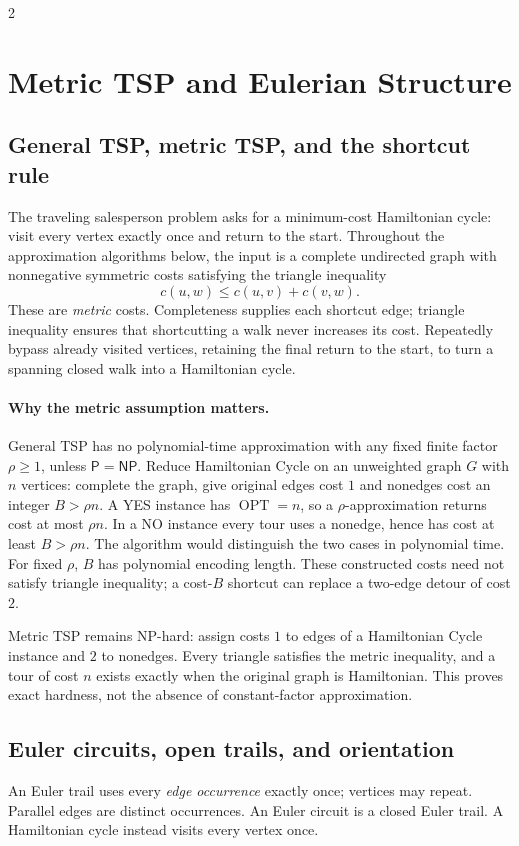 \documentclass[8pt]{extarticle}
\theoremstyle{definition}
\newcommand{\OPT}{\operatorname{OPT}}
\newcommand{\NP}{\mathsf{NP}}
\newcommand{\PTIME}{\mathsf{P}}
\begin{document}
\begin{multicols*}{2}
\section{Metric TSP and Eulerian Structure}\label{tsp:main}

\subsection{General TSP, metric TSP, and the shortcut rule}
The traveling salesperson problem asks for a minimum-cost Hamiltonian
cycle: visit every vertex exactly once and return to the start.  Throughout
the approximation algorithms below, the input is a complete undirected
graph with nonnegative symmetric costs satisfying the triangle inequality
\[
c(u,w)\le c(u,v)+c(v,w).
\]
These are \emph{metric} costs.  Completeness supplies each shortcut edge;
triangle inequality ensures that shortcutting a walk never increases its
cost.  Repeatedly bypass already visited vertices, retaining the final
return to the start, to turn a spanning closed walk into a Hamiltonian cycle.

\paragraph{Why the metric assumption matters.}
General TSP has no polynomial-time approximation with any fixed finite
factor $\rho\ge1$, unless $\PTIME=\NP$.  Reduce Hamiltonian Cycle on an
unweighted graph $G$ with $n$ vertices: complete the graph, give original
edges cost $1$ and nonedges cost an integer $B>\rho n$.  A YES instance has
$\OPT=n$, so a $\rho$-approximation returns cost at most $\rho n$.  In a NO
instance every tour uses a nonedge, hence has cost at least $B>\rho n$.
The algorithm would distinguish the two cases in polynomial time.  For
fixed $\rho$, $B$ has polynomial encoding length.  These constructed costs
need not satisfy triangle inequality; a cost-$B$ shortcut can replace a
two-edge detour of cost $2$.

Metric TSP remains NP-hard: assign costs $1$ to edges of a Hamiltonian Cycle
instance and $2$ to nonedges.  Every triangle satisfies the metric inequality,
and a tour of cost $n$ exists exactly when the original graph is Hamiltonian.
This proves exact hardness, not the absence of constant-factor approximation.

\subsection{Euler circuits, open trails, and orientation}\label{tsp:euler}
An Euler trail uses every \emph{edge occurrence} exactly once; vertices may
repeat.  Parallel edges are distinct occurrences.  An Euler circuit is a
closed Euler trail.  A Hamiltonian cycle instead visits every vertex once.


\end{multicols*}
\end{document}

